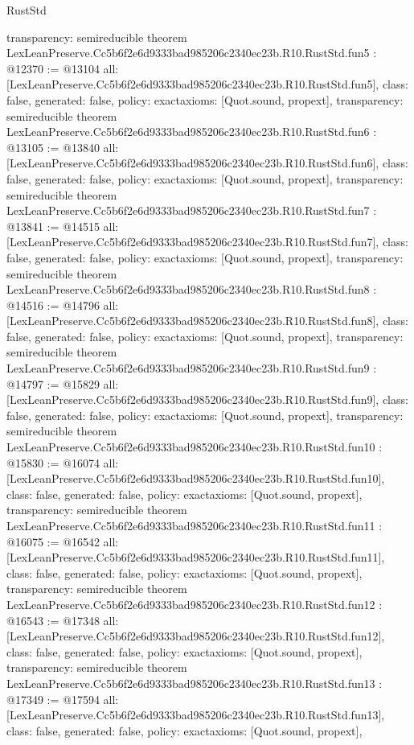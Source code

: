 \begin{lexlean}{RustStd}
\begin{coremodule}
{  transparency: semireducible
}
theorem LexLeanPreserve.Cc5b6f2e6d9333bad985206c2340ec23b.R10.RustStd.fun5 : @12370 := @13104 {
  all: [LexLeanPreserve.Cc5b6f2e6d9333bad985206c2340ec23b.R10.RustStd.fun5],
  class: false,
  generated: false,
  policy: exact{axioms: [Quot.sound, propext]},
  transparency: semireducible
}
theorem LexLeanPreserve.Cc5b6f2e6d9333bad985206c2340ec23b.R10.RustStd.fun6 : @13105 := @13840 {
  all: [LexLeanPreserve.Cc5b6f2e6d9333bad985206c2340ec23b.R10.RustStd.fun6],
  class: false,
  generated: false,
  policy: exact{axioms: [Quot.sound, propext]},
  transparency: semireducible
}
theorem LexLeanPreserve.Cc5b6f2e6d9333bad985206c2340ec23b.R10.RustStd.fun7 : @13841 := @14515 {
  all: [LexLeanPreserve.Cc5b6f2e6d9333bad985206c2340ec23b.R10.RustStd.fun7],
  class: false,
  generated: false,
  policy: exact{axioms: [Quot.sound, propext]},
  transparency: semireducible
}
theorem LexLeanPreserve.Cc5b6f2e6d9333bad985206c2340ec23b.R10.RustStd.fun8 : @14516 := @14796 {
  all: [LexLeanPreserve.Cc5b6f2e6d9333bad985206c2340ec23b.R10.RustStd.fun8],
  class: false,
  generated: false,
  policy: exact{axioms: [Quot.sound, propext]},
  transparency: semireducible
}
theorem LexLeanPreserve.Cc5b6f2e6d9333bad985206c2340ec23b.R10.RustStd.fun9 : @14797 := @15829 {
  all: [LexLeanPreserve.Cc5b6f2e6d9333bad985206c2340ec23b.R10.RustStd.fun9],
  class: false,
  generated: false,
  policy: exact{axioms: [Quot.sound, propext]},
  transparency: semireducible
}
theorem LexLeanPreserve.Cc5b6f2e6d9333bad985206c2340ec23b.R10.RustStd.fun10 : @15830 := @16074 {
  all: [LexLeanPreserve.Cc5b6f2e6d9333bad985206c2340ec23b.R10.RustStd.fun10],
  class: false,
  generated: false,
  policy: exact{axioms: [Quot.sound, propext]},
  transparency: semireducible
}
theorem LexLeanPreserve.Cc5b6f2e6d9333bad985206c2340ec23b.R10.RustStd.fun11 : @16075 := @16542 {
  all: [LexLeanPreserve.Cc5b6f2e6d9333bad985206c2340ec23b.R10.RustStd.fun11],
  class: false,
  generated: false,
  policy: exact{axioms: [Quot.sound, propext]},
  transparency: semireducible
}
theorem LexLeanPreserve.Cc5b6f2e6d9333bad985206c2340ec23b.R10.RustStd.fun12 : @16543 := @17348 {
  all: [LexLeanPreserve.Cc5b6f2e6d9333bad985206c2340ec23b.R10.RustStd.fun12],
  class: false,
  generated: false,
  policy: exact{axioms: [Quot.sound, propext]},
  transparency: semireducible
}
theorem LexLeanPreserve.Cc5b6f2e6d9333bad985206c2340ec23b.R10.RustStd.fun13 : @17349 := @17594 {
  all: [LexLeanPreserve.Cc5b6f2e6d9333bad985206c2340ec23b.R10.RustStd.fun13],
  class: false,
  generated: false,
  policy: exact{axioms: [Quot.sound, propext]},
}
\end{coremodule}
\end{lexlean}
